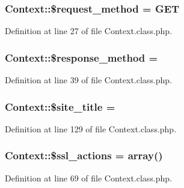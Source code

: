 \subsubsection[{\$request\+\_\+method}]{\setlength{\rightskip}{0pt plus 5cm}Context\+::\$request\+\_\+method = \textquotesingle{}G\+E\+T\textquotesingle{}}\label{classContext_a1e80f487f65708456eb17be0024aee50}


Definition at line 27 of file Context.\+class.\+php.

\hypertarget{classContext_a383836fb81ee24d673c7145e4d2eb030}{}
\subsubsection[{\$response\+\_\+method}]{\setlength{\rightskip}{0pt plus 5cm}Context\+::\$response\+\_\+method = \textquotesingle{}\textquotesingle{}}\label{classContext_a383836fb81ee24d673c7145e4d2eb030}


Definition at line 39 of file Context.\+class.\+php.

\hypertarget{classContext_a3663ad0bbcb194dbb5766db96c9ecefb}{}
\subsubsection[{\$site\+\_\+title}]{\setlength{\rightskip}{0pt plus 5cm}Context\+::\$site\+\_\+title = \textquotesingle{}\textquotesingle{}}\label{classContext_a3663ad0bbcb194dbb5766db96c9ecefb}


Definition at line 129 of file Context.\+class.\+php.

\hypertarget{classContext_a9f8d33aa42d3851da1134d3ba2fbf009}{}
\subsubsection[{\$ssl\+\_\+actions}]{\setlength{\rightskip}{0pt plus 5cm}Context\+::\$ssl\+\_\+actions = array()}\label{classContext_a9f8d33aa42d3851da1134d3ba2fbf009}


Definition at line 69 of file Context.\+class.\+php.

\hypertarget{classContext_a5554b6376a0703ebfbdf2bf79800bfee}{}
